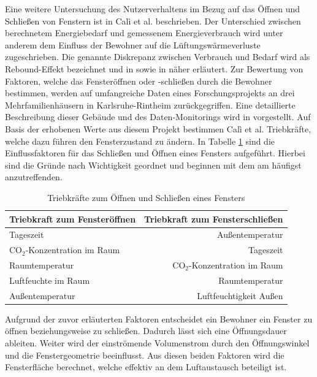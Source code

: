 Eine weitere Untersuchung des Nutzerverhaltens im Bezug auf das Öffnen und Schließen von Fenstern ist in Calì et al. \cite{Cali.2016b} beschrieben.
Der Unterschied zwischen berechnetem Energiebedarf und gemessenem Energieverbrauch wird unter anderem dem Einfluss der Bewohner auf die Lüftungswärmeverluste zugeschrieben.
Die genannte Diskrepanz zwischen Verbrauch und Bedarf wird als Rebound-Effekt bezeichnet und in \cite{Haas.2000} sowie in \cite{Cali.2016} näher erläutert.
Zur Bewertung von Faktoren, welche das Fensteröffnen oder -schließen durch die Bewohner bestimmen, werden auf umfangreiche Daten eines Forschungsprojekts an drei Mehrfamilienhäusern in Karlsruhe-Rintheim zurückgegriffen.
Eine detaillierte Beschreibung dieser Gebäude und des Daten-Monitorings wird in \cite{Cali.Holistic} vorgestellt.
Auf Basis der erhobenen Werte aus diesem Projekt bestimmen Calì et al. Triebkräfte, welche dazu führen den Fensterzustand zu ändern.
In Tabelle \ref{tab: Tabelle3312} sind die Einflussfaktoren für das Schließen und Öffnen eines Fensters aufgeführt.
Hierbei sind die Gründe nach Wichtigkeit geordnet und beginnen mit dem am häufigst anzutreffenden.

\begin{table}[H]\centering
\begin{tabular}{|l|r|}
\hline
\rowcolor[HTML]{C0C0C0} 
Triebkraft zum Fensteröffnen & Triebkraft zum Fensterschließen \\ \hline
Tageszeit & Außentemperatur \\ \hline
\rowcolor[HTML]{EFEFEF} 
CO\(_2\)-Konzentration im Raum & Tageszeit \\ \hline
Raumtemperatur & CO\(_2\)-Konzentration im Raum\\ \hline
\rowcolor[HTML]{EFEFEF} 
Luftfeuchte im Raum & Raumtemperatur \\ \hline
Außentemperatur & Luftfeuchtigkeit Außen \\ \hline
\end{tabular}
\caption{Triebkräfte zum Öffnen und Schließen eines Fensters \cite{Cali.2016b}}
\label{tab: Tabelle3312}
\end{table}

Aufgrund der zuvor erläuterten Faktoren entscheidet ein Bewohner ein Fenster zu öffnen beziehungsweise zu schließen.
Dadurch lässt sich eine Öffnungsdauer ableiten.
Weiter wird der einströmende Volumenstrom durch den Öffnungswinkel und die Fenstergeometrie beeinflusst.
Aus diesen beiden Faktoren wird die Fensterfläche berechnet, welche effektiv an dem Luftaustausch beteiligt ist.\cite{Hall.2004}

